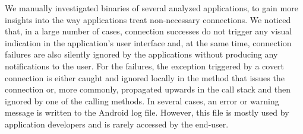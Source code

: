 We manually investigated binaries of several analyzed applications, to gain more insights into the way applications treat non-necessary connections. %
We noticed that, in a large number of cases, connection successes do not trigger any visual indication  in the application's user interface and, at the same time, connection failures are also silently ignored by the applications without producing any notifications to the user. 
For the failures, the exception triggered by a covert connection is either caught and ignored locally in the method that issues the connection or, more commonly, propagated upwards in the call stack and then ignored by one of the calling methods. In several cases, an error or warning message is written to the Android log file. However, this file is mostly used by  application developers and is rarely accessed by the end-user.












